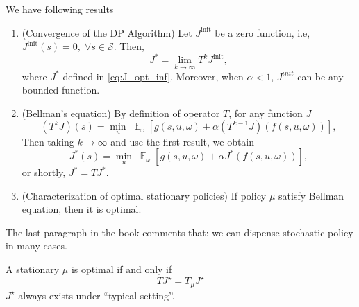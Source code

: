 \documentclass[11pt,a4paper]{article}
\begin{document}
\begin{theorem}
    \label{theorem:main_result}
    We have following results \parencite[Section 1.1.3]{bertsekas1999dynamic}
    \begin{enumerate}
        \item (Convergence of the DP Algorithm) Let $J^{\text{init}}$ be a zero function, i.e, $J^{\text{init}}(s) = 0, \; \forall s \in \mathcal{S}$. Then,
            \[
            J^{*} = \lim_{k \to \infty} T^{k} J^{\text{init}},
            \] 
            where $J^{*}$ defined in \eqref{eq:J_opt_inf}.
            Moreover, when $\alpha<1$, $J^{init}$ can be any bounded function.
        \item (Bellman's equation) By definition of operator $T$, for any function $J$
            \[
                (T^{k} J)(s) = \min_{u} \; \mathop{\mathbb{E}}_{\omega} \left[ g(s, u, \omega) + \alpha (T^{k-1} J)(f(s, u, \omega)) \right],
            \] 
            Then taking $k \to \infty$ and use the first result, we obtain
            \begin{equation}
                \label{eq:bellman}
                J^{* }(s) = \min_{u} \; \mathop{\mathbb{E}}_{\omega} \left[ g(s, u, \omega) + \alpha J^{* }(f(s, u, \omega)) \right],
            \end{equation} 
            or shortly, $J^{* } = T J^{* }$.
        \item (Characterization of optimal stationary policies) If policy $\mu$ satisfy Bellman equation, then it is optimal.
    \end{enumerate}
\end{theorem}

The last paragraph in the book comments that: we can dispense stochastic policy in many cases.

\begin{proposition}
    A stationary $\mu$ is optimal if and only if 
    \[
    T J^{\star } = T_\mu J^{\star }
    \] 
$J^{\star }$ always exists under ``typical setting''. 
\end{proposition}
\end{document}
